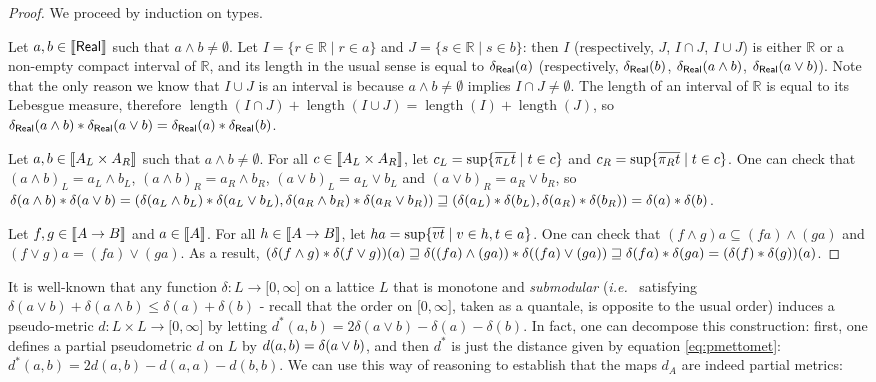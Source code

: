 \begin{proof}
We proceed by induction on types.

Let $a,b \in \llbracket \mathsf{Real} \rrbracket$ such that $a\wedge b \neq \emptyset$. Let $I = \{r \in \mathbb{R} \mid r \in a\}$ and $J = \{s \in \mathbb{R} \mid s \in b\}$: then $I$ (respectively, $J$, $I \cap J$, $I \cup J$) is either $\mathbb{R}$ or a non-empty compact interval of $\mathbb{R}$, and its length in the usual sense is equal to $\delta_\mathsf{Real}(a)$ (respectively, $\delta_\mathsf{Real}(b)$, $\delta_\mathsf{Real}(a \wedge b)$, $\delta_\mathsf{Real}(a \vee b)$). Note that the only reason we know that $I \cup J$ is an interval is because $a\wedge b \neq \emptyset$ implies $I \cap J \neq \emptyset$. The length of an interval of $\mathbb{R}$ is equal to its Lebesgue measure, therefore $\operatorname{length}(I \cap J) + \operatorname{length}(I \cup J) = \operatorname{length}(I) + \operatorname{length}(J)$, so $\delta_\mathsf{Real}(a \wedge b) \mathbin{\ast} \delta_\mathsf{Real}(a \vee b) = \delta_\mathsf{Real}(a) \mathbin{\ast} \delta_\mathsf{Real}(b)$.

Let $a,b \in \llbracket A_L \times A_R \rrbracket$ such that $a\wedge b \neq \emptyset$. For all $c \in \llbracket A_L \times A_R \rrbracket$, let $c_L = \sup\{\overline{\pi_L t} \mid t \in c\}$ and $c_R = \sup\{\overline{\pi_R t} \mid t \in c\}$.
One can check that $(a \wedge b)_L = a_L \wedge b_L$, $(a \wedge b)_R = a_R \wedge b_R$, $(a \vee b)_L = a_L \vee b_L$ and $(a \vee b)_R = a_R \vee b_R$, so $\delta(a \wedge b) \mathbin{\ast} \delta(a \vee b) = (\delta(a_L \wedge b_L) \mathbin{\ast} \delta(a_L \vee b_L),  \delta(a_R \wedge b_R) \mathbin{\ast} \delta(a_R \vee b_R)) \sqsupseteq (\delta(a_L) \mathbin{\ast} \delta(b_L), \delta(a_R) \mathbin{\ast} \delta(b_R)) = \delta(a) \mathbin{\ast} \delta(b)$.

Let $f,g \in \llbracket A \to B \rrbracket$ and $a \in \llbracket A \rrbracket$. For all $h \in \llbracket A \to B \rrbracket$, let $ha = \sup\{\overline{vt} \mid v \in h, t \in a\}$. One can check that $(f \wedge g)a \subseteq (f a) \wedge (g a)$ and $(f \vee g)a = (f a) \vee (g a)$. As a result, $(\delta(f \wedge g)\mathbin{\ast} \delta(f \vee g))(a) \sqsupseteq \delta((fa) \wedge (ga)) \mathbin{\ast} \delta((fa) \vee (ga)) \sqsupseteq \delta(fa) \mathbin{\ast} \delta(ga) = (\delta(f)\mathbin{\ast}\delta(g))(a)$.
\end{proof}

It is well-known  \cite{6845021} that any 
function $\delta: L\to \mathbb [0,\infty]$ on a lattice $L$ that is monotone and \emph{submodular}  (\emph{i.e.}~ satisfying $\delta(a\vee b)+ \delta(a\wedge b) \leq \delta(a)+\delta(b)$ - recall that the order on $\mathbb [0,\infty]$, taken as a quantale, is opposite to the usual order) induces a pseudo-metric $d: L\times L \to \mathbb [0,\infty]$ by letting $d^*(a,b)=2\delta(a\vee b)-\delta(a)-\delta(b)$. In fact, one can decompose this construction: first, one defines a partial pseudometric $d$ on $L$ by $d(a,b) = \delta(a \vee b)$, and then $d^*$ is just the distance given by equation \eqref{eq:pmettomet}: $d^*(a,b) = 2d(a,b)-d(a,a)-d(b,b)$. We can use this way of reasoning to establish that the maps $d_{A}$ are indeed partial metrics:

